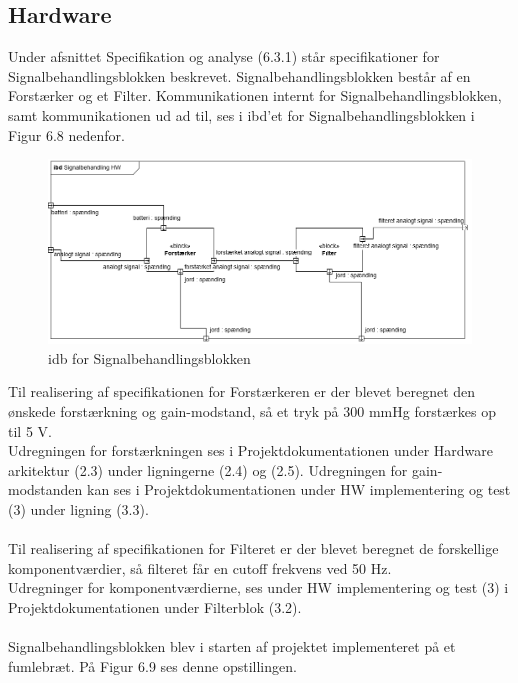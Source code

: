\subsection{Hardware}
Under afsnittet Specifikation og analyse (6.3.1) står specifikationer for Signalbehandlingsblokken beskrevet. Signalbehandlingsblokken består af en Forstærker og et Filter. Kommunikationen internt for Signalbehandlingsblokken, samt kommunikationen ud ad til, ses i ibd'et for Signalbehandlingsblokken i Figur 6.8 nedenfor.  

\begin{figure}[H]
	\centering
	\includegraphics[width=1\textwidth]{Figurer/5}
	\caption{idb for Signalbehandlingsblokken}
\end{figure}

Til realisering af specifikationen for Forstærkeren er der blevet beregnet den ønskede forstærkning og gain-modstand, så et tryk på 300 mmHg forstærkes op til 5 V.\\
Udregningen for forstærkningen ses i Projektdokumentationen under Hardware arkitektur (2.3) under ligningerne (2.4) og (2.5). Udregningen for gain-modstanden kan ses i Projektdokumentationen under HW implementering og test (3) under ligning (3.3).  
\\\\
Til realisering af specifikationen for Filteret er der blevet beregnet de forskellige komponentværdier, så filteret får en cutoff frekvens ved 50 Hz.\\
Udregninger for komponentværdierne, ses under HW implementering og test (3) i Projektdokumentationen under Filterblok (3.2). 
\\\\ 
Signalbehandlingsblokken blev i starten af projektet implementeret på et fumlebræt. På Figur 6.9 ses denne opstillingen. 

